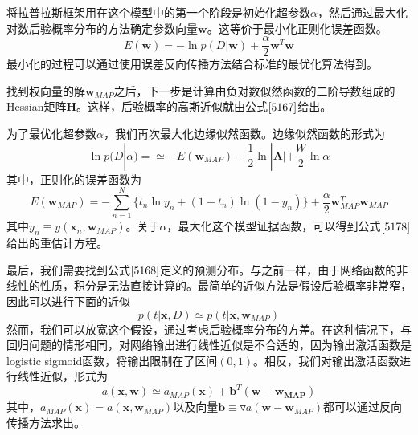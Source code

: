 将拉普拉斯框架用在这个模型中的第一个阶段是初始化超参数$\alpha$，然后通过最大化对数后验概率分布的方法确定参数向量$\boldsymbol{w}$。这等价于最小化正则化误差函数。
\begin{equation}
	E(\boldsymbol{w})=-\ln p(D|\boldsymbol{w})+\frac{\alpha}{2}\boldsymbol{w}^T\boldsymbol{w}
\end{equation}
最小化的过程可以通过使用误差反向传播方法结合标准的最优化算法得到。

找到权向量的解$\boldsymbol{w}_{MAP}$之后，下一步是计算由负对数似然函数的二阶导数组成的Hessian矩阵$\boldsymbol{H}$。这样，后验概率的高斯近似就由公式$\ref{5167}$给出。

为了最优化超参数$\alpha$，我们再次最大化边缘似然函数。边缘似然函数的形式为
\begin{equation}
	\ln p(D|\alpha)=\simeq -E(\boldsymbol{w}_{MAP})-\frac{1}{2}\ln |\boldsymbol{A}|+\frac{W}{2}\ln \alpha
\end{equation}
其中，正则化的误差函数为
\begin{equation}
	E(\boldsymbol{w}_{MAP})=-\sum_{n=1}^{N}\{t_n\ln y_n+(1-t_n)\ln (1-y_n) \}+\frac{\alpha}{2}\boldsymbol{w}_{MAP}^T\boldsymbol{w}_{MAP}
\end{equation}
其中$y_n\equiv y(\boldsymbol{x}_n,\boldsymbol{w}_{MAP})$。关于$\alpha$，最大化这个模型证据函数，可以得到公式$\ref{5178}$给出的重估计方程。

最后，我们需要找到公式$\ref{5168}$定义的预测分布。与之前一样，由于网络函数的非线性的性质，积分是无法直接计算的。最简单的近似方法是假设后验概率非常窄，因此可以进行下面的近似
\begin{equation}
	p(t|\boldsymbol{x},D)\simeq p(t|\boldsymbol{x},\boldsymbol{w}_{MAP})
\end{equation}
然而，我们可以放宽这个假设，通过考虑后验概率分布的方差。在这种情况下，与回归问题的情形相同，对网络输出进行线性近似是不合适的，因为输出激活函数是logistic sigmoid函数，将输出限制在了区间$(0,1)$。相反，我们对输出激活函数进行线性近似，形式为
\begin{equation}
	a(\boldsymbol{x},\boldsymbol{w})\simeq a_{MAP}(\boldsymbol{x})+\boldsymbol{b}^T(\boldsymbol{w}-\boldsymbol{w_{MAP}})
\end{equation}
其中，$a_{MAP}(\boldsymbol{x})=a(\boldsymbol{x},\boldsymbol{w}_{MAP})$以及向量$\boldsymbol{b}\equiv \triangledown a(\boldsymbol{w}-\boldsymbol{w}_{MAP})$都可以通过反向传播方法求出。

